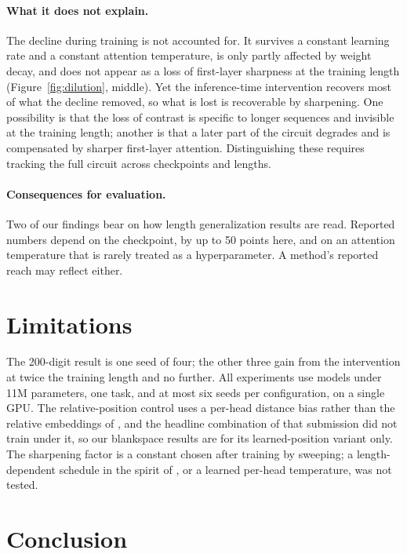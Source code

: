\documentclass{article}
\begin{document}
\paragraph{What it does not explain.} The decline during training is not accounted for. It survives a constant learning rate and a constant attention temperature, is only partly affected by weight decay, and does not appear as a loss of first-layer sharpness at the training length (Figure~\ref{fig:dilution}, middle). Yet the inference-time intervention recovers most of what the decline removed, so what is lost is recoverable by sharpening. One possibility is that the loss of contrast is specific to longer sequences and invisible at the training length; another is that a later part of the circuit degrades and is compensated by sharper first-layer attention. Distinguishing these requires tracking the full circuit across checkpoints and lengths.

\paragraph{Consequences for evaluation.} Two of our findings bear on how length generalization results are read. Reported numbers depend on the checkpoint, by up to 50 points here, and on an attention temperature that is rarely treated as a hyperparameter. A method's reported reach may reflect either.

\section{Limitations}

The 200-digit result is one seed of four; the other three gain from the intervention at twice the training length and no further. All experiments use models under 11M parameters, one task, and at most six seeds per configuration, on a single GPU. The relative-position control uses a per-head distance bias rather than the relative embeddings of \citet{shaw2018self}, and the headline combination of that submission \citep{aba2025} did not train under it, so our blankspace results are for its learned-position variant only. The sharpening factor is a constant chosen after training by sweeping; a length-dependent schedule in the spirit of \citet{chiang2022overcoming}, or a learned per-head temperature, was not tested.

\section{Conclusion}
\end{document}
